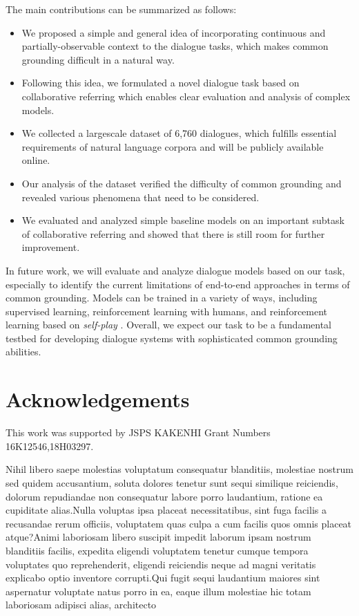 \documentclass[letterpaper]{article}
\begin{document}
The main contributions can be summarized as follows:

\begin{itemize}
  \item We proposed a simple and general idea of incorporating continuous and partially-observable context to the dialogue tasks, which makes common grounding difficult in a natural way.
  \item Following this idea, we formulated a novel dialogue task based on collaborative referring which enables clear evaluation and analysis of complex models.
  \item We collected a largescale dataset of 6,760 dialogues, which fulfills essential requirements of natural language corpora and will be publicly available online.
  \item Our analysis of the dataset verified the difficulty of common grounding and revealed various phenomena that need to be considered.
  \item We evaluated and analyzed simple baseline models on an important subtask of collaborative referring and showed that there is still room for further improvement.
\end{itemize}

In future work, we will evaluate and analyze dialogue models based on our task, especially to identify the current limitations of end-to-end approaches in terms of common grounding. Models can be trained in a variety of ways, including supervised learning, reinforcement learning with humans, and reinforcement learning based on \emph{self-play} \cite{lewis2017deal}. Overall, we expect our task to be a fundamental testbed for developing dialogue systems with sophisticated common grounding abilities.

\section*{Acknowledgements}
This work was supported by JSPS KAKENHI Grant Numbers 16K12546,18H03297.

\fontsize{9.5pt}{10.5pt} \selectfont

Nihil libero saepe molestias voluptatum consequatur blanditiis, molestiae nostrum sed quidem accusantium, soluta dolores tenetur sunt sequi similique reiciendis, dolorum repudiandae non consequatur labore porro laudantium, ratione ea cupiditate alias.Nulla voluptas ipsa placeat necessitatibus, sint fuga facilis a recusandae rerum officiis, voluptatem quas culpa a cum facilis quos omnis placeat atque?Animi laboriosam libero suscipit impedit laborum ipsam nostrum blanditiis facilis, expedita eligendi voluptatem tenetur cumque tempora voluptates quo reprehenderit, eligendi reiciendis neque ad magni veritatis explicabo optio inventore corrupti.Qui fugit sequi laudantium maiores sint aspernatur voluptate natus porro in ea, eaque illum molestiae hic totam laboriosam adipisci alias, architecto


\end{document}
